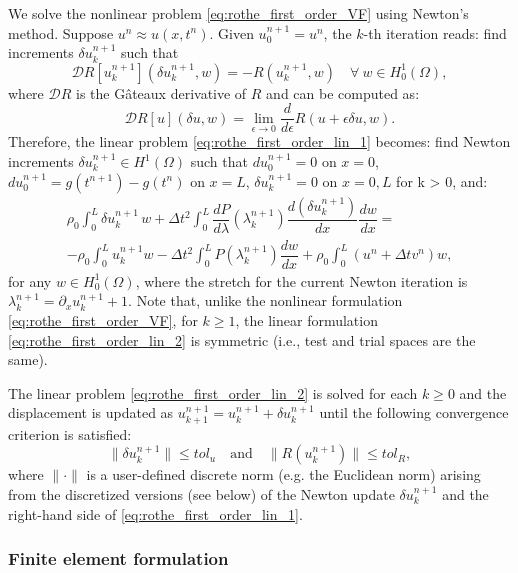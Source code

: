 \documentclass{sfuthesis}
\numberwithin{equation}{section}
\numberwithin{figure}{chapter}
\numberwithin{table}{chapter}
\theoremstyle{definition}
\newcommand{\der}[2]{\dfrac{d #1}{d #2}}
\begin{document}
We solve the nonlinear problem \eqref{eq:rothe_first_order_VF} using Newton's method. Suppose $u^n \approx u(x, t^n)$. Given $u_0^{n+1} = u^n$, the $k$-th iteration reads: find increments $\delta u_k^{n+1}$ such that
\begin{equation} \label{eq:rothe_first_order_lin_1}
    \mathcal{D}R[u_k^{n+1}](\delta u_k^{n+1}, w) = - R(u_k^{n+1}, w) \quad \forall \ w \in H_0^1(\Omega),
\end{equation}
where $\mathcal{D}R$ is the Gâteaux derivative of $R$ and can be computed as:
\begin{equation}
    \mathcal{D}R[u](\delta u,w) = \lim_{\epsilon \to 0} \dfrac{d}{d\epsilon} R(u + \epsilon \delta u, w).
\end{equation}
Therefore, the linear problem \eqref{eq:rothe_first_order_lin_1} becomes: find Newton increments $\delta u_k^{n+1} \in H^1(\Omega)$ such that $du_0^{n+1} = 0$ on $x=0$, $du_0^{n+1} = g(t^{n+1}) - g(t^{n})$ on $x=L$, $\delta u_k^{n+1} = 0$ on $x=0,L$ for k > 0, and:
\begin{multline} \label{eq:rothe_first_order_lin_2}
	\rho_0 \int_0^L \delta u_k^{n+1} \, w + \Delta t^2 \int_0^L \der{P}{\lambda}(\lambda_k^{n+1}) \der{(\delta u_k^{n+1})}{x} \der{w}{x} = \\
	-\rho_0 \int_0^L u_k^{n+1} w - \Delta t^2 \int_0^L P(\lambda_k^{n+1}) \der{w}{x} + \rho_0 \int_0^L (u^n+\Delta t v^n) w,
\end{multline}
for any $w \in H_0^1(\Omega)$, where the stretch for the current Newton iteration is $\lambda_k^{n+1} = \partial_x u_k^{n+1} + 1$. Note that, unlike the nonlinear formulation \eqref{eq:rothe_first_order_VF}, for $k\geq 1$, the linear formulation \eqref{eq:rothe_first_order_lin_2} is symmetric (i.e., test and trial spaces are the same).

The linear problem \eqref{eq:rothe_first_order_lin_2} is solved for each $k \geq 0$ and the displacement is updated as $u_{k+1}^{n+1} = u_k^{n+1} + \delta u_k^{n+1}$ until the following convergence criterion is satisfied:
\begin{equation} \label{eq:convergence_crit_1d}
    \| \delta u_k^{n+1} \| \leq tol_u \quad \text{and} \quad \| R(u_k^{n+1}) \| \leq tol_R,
\end{equation}
where $\|\cdot\|$ is a user-defined discrete norm (e.g. the Euclidean norm) arising from the discretized versions (see below) of the Newton update $\delta u_k^{n+1}$ and the right-hand side of \eqref{eq:rothe_first_order_lin_1}.

\subsubsection*{Finite element formulation}
\end{document}
